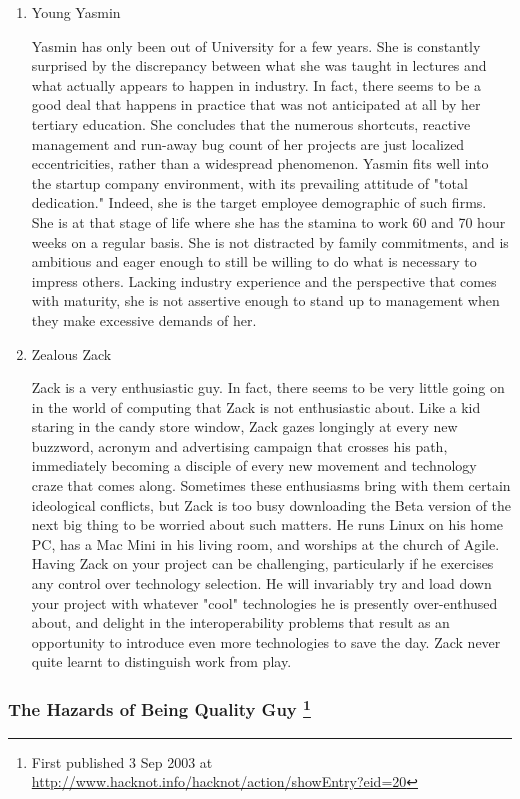 \documentclass{article}
\begin{document}
\begin{enumerate}
\item Young Yasmin
\label{sec:orgheadline28}

Yasmin has only been out of University for a few years. She is
constantly surprised by the discrepancy between what she was taught in
lectures and what actually appears to happen in industry. In fact, there
seems to be a good deal that happens in practice that was not
anticipated at all by her tertiary education. She concludes that the
numerous shortcuts, reactive management and run-away bug count of her
projects are just localized eccentricities, rather than a widespread
phenomenon. Yasmin fits well into the startup company environment, with
its prevailing attitude of "total dedication." Indeed, she is the target
employee demographic of such firms. She is at that stage of life where
she has the stamina to work 60 and 70 hour weeks on a regular basis. She
is not distracted by family commitments, and is ambitious and eager
enough to still be willing to do what is necessary to impress others.
Lacking industry experience and the perspective that comes with
maturity, she is not assertive enough to stand up to management when
they make excessive demands of her.

\item Zealous Zack
\label{sec:orgheadline29}

Zack is a very enthusiastic guy. In fact, there seems to be very little
going on in the world of computing that Zack is not enthusiastic about.
Like a kid staring in the candy store window, Zack gazes longingly at
every new buzzword, acronym and advertising campaign that crosses his
path, immediately becoming a disciple of every new movement and
technology craze that comes along. Sometimes these enthusiasms bring
with them certain ideological conflicts, but Zack is too busy
downloading the Beta version of the next big thing to be worried about
such matters. He runs Linux on his home PC, has a Mac Mini in his living
room, and worships at the church of Agile. Having Zack on your project
can be challenging, particularly if he exercises any control over
technology selection. He will invariably try and load down your project
with whatever "cool" technologies he is presently over-enthused about,
and delight in the interoperability problems that result as an
opportunity to introduce even more technologies to save the day. Zack
never quite learnt to distinguish work from play.
\end{enumerate}

\subsubsection{The Hazards of Being Quality Guy  \footnote{First published 3 Sep 2003 at
\url{http://www.hacknot.info/hacknot/action/showEntry?eid=20}}}
\label{sec:orgheadline31}
\end{document}
